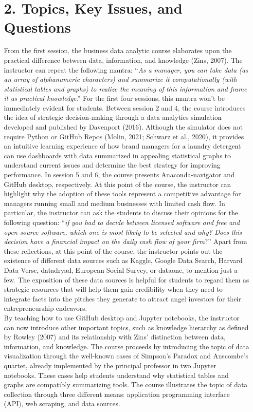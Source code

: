 \documentclass[letterpaper,11pt]{article}
\begin{document}
\section{2. Topics, Key Issues, and Questions}
From the first session, the business data analytic course elaborates upon the practical difference between data, information, and knowledge (Zins, 2007). The instructor can repeat the following mantra: ``\textit{As a manager, you can take data (as an array of alphanumeric characters) and summarize it computationally  (with statistical tables and graphs) to realize the meaning of this information and frame it as practical knowledge}.'' For the first four sessions, this mantra won't be immediately evident for students. Between session 2 and 4, the course introduces the idea of strategic decision-making through a data analytics simulation developed and published by Davenport (2016). Although the simulator does not require Python or GitHub Repos (Molin, 2021; Schwarz et al., 2020), it provides an intuitive learning experience of how brand managers for a laundry detergent can use dashboards with data summarized in appealing statistical graphs to understand current issues and determine the best strategy for improving performance. In session 5 and 6, the course presents Anaconda-navigator and GitHub desktop, respectively. At this point of the course, the instructor can highlight why the adoption of these tools represent a competitive advantage for managers running small and medium businesses with limited cash flow. In particular, the instructor can ask the students to discuss their opinions for the following question: ``\textit{if you had to decide between licensed software and free and open-source software, which one is most likely to be selected and why? Does this decision have a financial impact on the daily cash flow of your firm}?'' Apart from these reflections, at this point of the course, the instructor points out the existence of different data sources such as Kaggle, Google Data Search, Harvard Data Verse, datadryad, European Social Survey, or dataone, to mention just a few. The exposition of these data sources is helpful for students to regard them as strategic resources that will help them gain credibility when they need to integrate facts into the pitches they generate to attract angel investors for their entrepreneurship endeavors.\\
\vspace{0.3cm}
By teaching how to use GitHub desktop and Jupyter notebooks, the instructor can now introduce other important topics, such as knowledge hierarchy as defined by Rowley (2007) and its relationship with Zins' distinction between data, information, and knowledge. The course proceeds by introducing the topic of data visualization through the well-known cases of Simpson's Paradox and Anscombe's quartet, already implemented by the principal professor in two Jupyter notebooks. These cases help students understand why statistical tables and graphs are compatibly summarizing tools. The course illustrates the topic of data collection through three different means: application programming interface (API), web scraping, and data sources. \\
\end{document}
